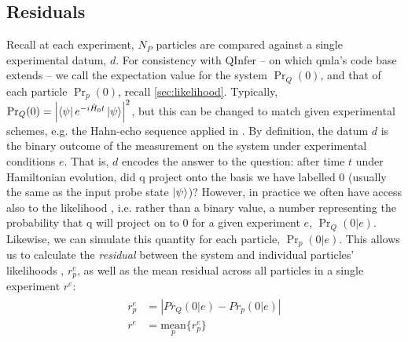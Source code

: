 \subsection{Residuals}\label{sec:residuals}
Recall at each experiment, $N_P$ particles are compared against a single experimental datum, $d$. 
For consistency with QInfer \cite{qinfer-1_0} -- on which \gls{qmla}'s code base extends --
    we call the expectation value for the system $\Pr_Q(0)$, 
    and that of each particle $\Pr_p(0)$, recall \cref{sec:likelihood}. 
Typically, $\Pr_Q(0) = \left| \bra{\psi} e^{-i\hat{H}_0 t} \ket{\psi} \right|^2$, 
    but this can be changed to match given experimental schemes, 
    e.g. the Hahn-echo sequence applied in \cite{gentile2020learning}. 
By definition, the datum $d$ is the binary outcome of the measurement on the system under experimental conditions $e$.
That is, $d$ encodes the answer to the question: 
    after time $t$ under Hamiltonian evolution, did \gls{q} project onto 
    the basis we have labelled $0$ (usually the same as the input \gls{probe} state $\ket{\psi}$)?
However, in practice we often have access also to the \gls{likelihood} , 
    i.e. rather than a binary value, a number representing the probability that 
    \gls{q} will project on to $0$ for a given experiment $e$, $\Pr_Q(0 | e)$. 
Likewise, we can simulate this quantity for each particle, $\Pr_p(0 | e)$. 
This allows us to calculate the \emph{residual} between the system and individual particles' \glspl{likelihood} , 
    $r_p^e$, as well as the mean residual across all particles in a single experiment $r^e$:
\begin{align}
    \label{eqn:particle_residual}
    \begin{split}
    r_p^e & = \left| Pr_Q(0 | e) - Pr_p(0 | e) \right|  \\
    r^e &= \underset{p}{\text{mean}} \{r_p^e\}
    \end{split}
\end{align}
\par 

